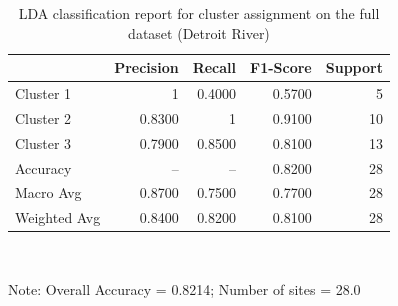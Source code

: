 \begin{table}[htbp]
  \centering
  \caption{LDA classification report for cluster assignment on the full dataset (Detroit River)}
  \label{tab:dr_03_LDA_Classification_lda_classification_report}
  \begin{tabular}{lrrrr}
    \toprule
     & Precision & Recall & F1-Score & Support \\
    \midrule
    Cluster 1 & 1 & 0.4000 & 0.5700 & 5 \\
    Cluster 2 & 0.8300 & 1 & 0.9100 & 10 \\
    Cluster 3 & 0.7900 & 0.8500 & 0.8100 & 13 \\
    Accuracy & – & – & 0.8200 & 28 \\
    Macro Avg & 0.8700 & 0.7500 & 0.7700 & 28 \\
    Weighted Avg & 0.8400 & 0.8200 & 0.8100 & 28 \\
    \bottomrule
  \end{tabular}
  \\[4pt]
  \parbox{\textwidth}{\footnotesize Note: Overall Accuracy = 0.8214; Number of sites = 28.0}
\end{table}
